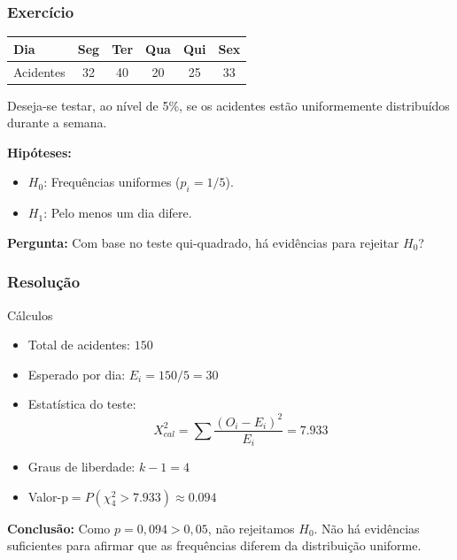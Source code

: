 \documentclass[14pt,aspectratio=1610]{beamer}
\begin{document}
\begin{frame}[fragile]
	\frametitle{Exercício}
	
	\small
	\vspace{-0.5cm}
	\begin{block}{}
		\begin{center}
			\begin{tabular}{lccccc}
				\hline
				Dia      & Seg & Ter & Qua & Qui & Sex \\ 
				\hline
				Acidentes & 32  & 40  & 20  & 25  & 33  \\ 
				\hline
			\end{tabular}
		\end{center}
		
		Deseja-se testar, ao nível de 5\%, se os acidentes estão uniformemente distribuídos durante a semana.
		
		\textbf{Hipóteses:}
		\begin{itemize}
			\item $H_0$: Frequências uniformes ($p_i = 1/5$).
			\item $H_1$: Pelo menos um dia difere.
		\end{itemize}
		
		\textbf{Pergunta:} Com base no teste qui-quadrado, há evidências para rejeitar $H_0$?
		
	\end{block}
\end{frame}

\begin{frame}[fragile]
	\frametitle{Resolução}
	
	\small
	\begin{block}{Cálculos}
		\justifying
		\begin{itemize}
			\item Total de acidentes: $150$
			\item Esperado por dia: $E_i = 150/5 = 30$
			\item Estatística do teste:
			\[
			X^2_{cal} = \sum \frac{(O_i - E_i)^2}{E_i} = 7.933
			\]
			\item Graus de liberdade: $k-1 = 4$
			\item Valor-p$ = P(\chi^2_4 > 7.933) \approx 0.094$
		\end{itemize}
		\vspace{-0.3cm}
		\textbf{Conclusão:} Como $p = 0{,}094 > 0{,}05$, não rejeitamos $H_0$. Não há evidências suficientes para afirmar que as frequências diferem da distribuição uniforme.
		
	\end{block}
\end{frame}
\end{document}
